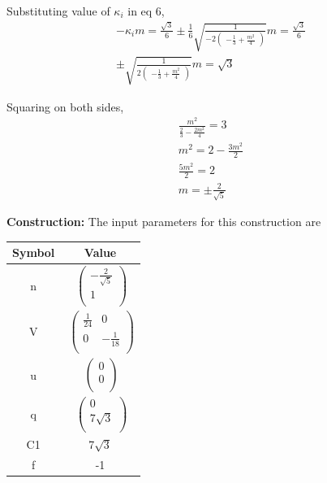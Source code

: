 \documentclass[8pt,a4paper]{report}
\newcommand{\myvec}[1]{\ensuremath{\begin{pmatrix}#1\end{pmatrix}}}
\begin{document}
\begin{multicols}{2}
\begin{gather*}
\end{gather*}
\raggedright Substituting value of $\kappa_i$ in eq 6,
\begin{align*}
  -\kappa_i m = \frac{\sqrt{3}}{6}
\pm\frac{1}{6}\sqrt{\frac{1}{-2\myvec{-\frac{1}{3}+\frac{m^2}{4}}}} m= \frac{\sqrt{3}}{6}\\
\pm\sqrt{\frac{1}{2\myvec{-\frac{1}{3}+\frac{m^2}{4}}}} m= \sqrt{3}
\end{align*}
\raggedright Squaring on both sides,
\begin{align*}
\frac{m^2}{\frac{2}{3}-\frac{2m^2}{4}} = 3\\
m^2 = 2 - \frac{3m^2}{2}\\
\frac{5m^2}{2} = 2\\
 m =\pm\frac{2}{\sqrt{5}}
\end{align*}
\raggedright\Large \textbf{Construction:} \vspace{2mm}
The input parameters for this construction are 
\begin{center}
\begin{tabular}{|c|c|}
	\hline
	\textbf{Symbol}&\textbf{Value}\\
	\hline
	n&$\
	\begin{pmatrix}
		-\frac{2}{\sqrt{5}}\\
		1\\
	\end{pmatrix}$%
	\\
	\hline
	V&$\
	\begin{pmatrix}
		\frac{1}{24}&0\\
		0&-\frac{1}{18} \\
	\end{pmatrix}$%
	\\
	\hline
	u&$\
	\begin{pmatrix}
		0\\
		0\\
	\end{pmatrix}$%
	\\
	\hline
	q&$\
	\begin{pmatrix}
		0\\
		7\sqrt{3}\\
	\end{pmatrix}$%
	\\
	\hline
	C1& 7$\sqrt{3}$
	\\
	\hline
	f&-1\\
	\hline
\end{tabular}
\end{center}

\end{multicols}
\end{document}
